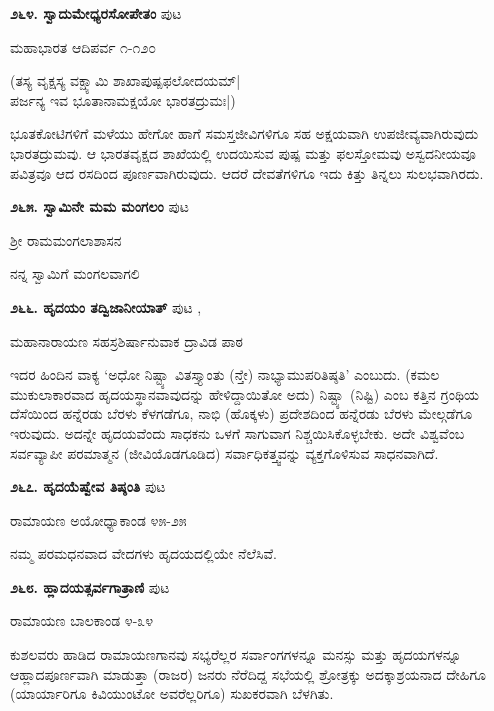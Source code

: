 \medskip
\noindent\textbf{೨೬೪. ಸ್ವಾದುಮೇಧ್ಯರಸೋಪೇತಂ} \hfill ಪುಟ \pageref{119d}

\hfill ಮಹಾಭಾರತ ಆದಿಪರ್ವ ೧-೧೨೦

\begin{shloka}
(ತಸ್ಯ ವೃಕ್ಷಸ್ಯ ವಕ್ಷ್ಯಾಮಿ ಶಾಖಾಪುಷ್ಪಫಲೋದಯಮ್|\\
ಪರ್ಜನ್ಯ ಇವ ಭೂತಾನಾಮಕ್ಷಯೋ ಭಾರತದ್ರುಮಃ|)
\end{shloka}

ಭೂತಕೋಟಿಗಳಿಗೆ ಮಳೆಯು ಹೇಗೋ ಹಾಗೆ ಸಮಸ್ತಜೀವಿಗಳಿಗೂ ಸಹ ಅಕ್ಷಯವಾಗಿ ಉಪಜೀವ್ಯವಾಗಿರುವುದು ಭಾರತದ್ರುಮವು. ಆ ಭಾರತವೃಕ್ಷದ ಶಾಖೆಯಲ್ಲಿ ಉದಯಿಸುವ ಪುಷ್ಪ ಮತ್ತು ಫಲಸ್ತೋಮವು ಅಸ್ವದನೀಯವೂ ಪವಿತ್ರವೂ ಆದ ರಸದಿಂದ ಪೂರ್ಣವಾಗಿರುವುದು. ಆದರೆ ದೇವತೆಗಳಿಗೂ ಇದು ಕಿತ್ತು ತಿನ್ನಲು ಸುಲಭವಾಗಿರದು.

\medskip
\noindent\textbf{೨೬೫. ಸ್ವಾಮಿನೇ ಮಮ ಮಂಗಲಂ} \hfill ಪುಟ \pageref{234}

\hfill ಶ್ರೀ ರಾಮಮಂಗಲಾಶಾಸನ

ನನ್ನ ಸ್ವಾಮಿಗೆ ಮಂಗಲವಾಗಲಿ

\medskip
\noindent\textbf{೨೬೬. ಹೃದಯಂ ತದ್ವಿಜಾನೀಯಾತ್} \hfill ಪುಟ \pageref{27a},\pageref{249e}

\hfill ಮಹಾನಾರಾಯಣ ಸಹಸ್ರಶಿರ್ಷಾನುವಾಕ ದ್ರಾವಿಡ ಪಾಠ

ಇದರ ಹಿಂದಿನ ವಾಕ್ಯ `ಅಧೋ ನಿಷ್ಟ್ಯಾ ವಿತಸ್ತ್ಯಾಂತು (ನ್ತೇ) ನಾಭ್ಯಾಮುಪರಿತಿಷ್ಠತಿ' ಎಂಬುದು. (ಕಮಲ ಮುಕುಲಾಕಾರವಾದ ಹೃದಯಸ್ಥಾನವಾವುದನ್ನು ಹೇಳಿದ್ದಾಯಿತೋ ಅದು) ನಿಷ್ಟ್ಯಾ (ನಿಷ್ಟಿ) ಎಂಬ ಕತ್ತಿನ ಗ್ರಂಥಿಯ ದೆಸೆಯಿಂದ ಹನ್ನೆರಡು ಬೆರಳು ಕೆಳಗಡೆಗೂ, ನಾಭಿ (ಹೊಕ್ಕಳು) ಪ್ರದೇಶದಿಂದ ಹನ್ನೆರಡು ಬೆರಳು ಮೇಲ್ಗಡೆಗೂ ಇರುವುದು. ಅದನ್ನೇ ಹೃದಯವೆಂದು ಸಾಧಕನು ಒಳಗೆ ಸಾಗುವಾಗ ನಿಶ್ಚಯಿಸಿಕೊಳ್ಳಬೇಕು. ಅದೇ ವಿಶ್ವವೆಂಬ ಸರ್ವವ್ಯಾಪೀ ಪರಮಾತ್ಮನ (ಜೀವಿಯೊಡಗೂಡಿದ) ಸರ್ವಾಧಿಕತ್ತ್ವವನ್ನು ವ್ಯಕ್ತಗೊಳಿಸುವ ಸಾಧನವಾಗಿದೆ.

\medskip
\noindent\textbf{೨೬೭. ಹೃದಯೆಷ್ವೇವ ತಿಷ್ಠಂತಿ} \hfill ಪುಟ \pageref{162b}

\hfill ರಾಮಾಯಣ ಅಯೋಧ್ಯಾಕಾಂಡ ೪೫-೨೫

ನಮ್ಮ ಪರಮಧನವಾದ ವೇದಗಳು ಹೃದಯದಲ್ಲಿಯೇ ನೆಲೆಸಿವೆ.

\medskip
\noindent\textbf{೨೬೮. ಹ್ಲಾದಯತ್ಸರ್ವಗಾತ್ರಾಣಿ} \hfill ಪುಟ \pageref{189c}

\hfill ರಾಮಾಯಣ ಬಾಲಕಾಂಡ ೪-೩೪

ಕುಶಲವರು ಹಾಡಿದ ರಾಮಾಯಣಗಾನವು ಸಭ್ಯರೆಲ್ಲರ ಸರ್ವಾಂಗಗಳನ್ನೂ ಮನಸ್ಸು ಮತ್ತು ಹೃದಯಗಳನ್ನೂ ಆಹ್ಲಾದಪೂರ್ಣವಾಗಿ ಮಾಡುತ್ತಾ (ರಾಜರ) ಜನರು ನೆರೆದಿದ್ದ ಸಭೆಯಲ್ಲಿ ಶ್ರೋತ್ರಕ್ಕು ಅದಕ್ಕಾಶ್ರಯನಾದ ದೇಹಿಗೂ (ಯಾರ್ಯಾರಿಗೂ ಕಿವಿಯುಂಟೋ ಅವರೆಲ್ಲರಿಗೂ) ಸುಖಕರವಾಗಿ ಬೆಳಗಿತು.
